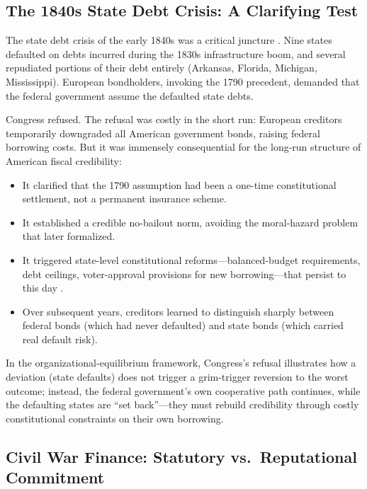 \documentclass[12pt]{article}
\begin{document}
\subsection{The 1840s State Debt Crisis: A Clarifying Test}

The state debt crisis of the early 1840s was a critical juncture
\citep{Ratchford1941, McGrane1935}.  Nine states defaulted on debts
incurred during the 1830s infrastructure boom, and several repudiated
portions of their debt entirely (Arkansas, Florida, Michigan,
Mississippi).  European bondholders, invoking the 1790 precedent,
demanded that the federal government assume the defaulted state debts.

Congress refused.  The refusal was costly in the short run: European
creditors temporarily downgraded all American government bonds, raising
federal borrowing costs.  But it was immensely consequential for the
long-run structure of American fiscal credibility:

\begin{itemize}
  \item It clarified that the 1790 assumption had been a one-time
    constitutional settlement, not a permanent insurance scheme.
  \item It  established a credible no-bailout norm, avoiding the
    moral-hazard problem that \citet{KarekenWallace1978} later
    formalized.
  \item It triggered state-level constitutional reforms---balanced-budget
    requirements, debt ceilings, voter-approval provisions for new
    borrowing---that persist to this day \citep{Wallis2005}.
  \item Over subsequent years, creditors learned to distinguish
    sharply between federal bonds (which had never defaulted) and state
    bonds (which carried real default risk).
\end{itemize}

In the organizational-equilibrium framework, Congress's refusal
illustrates how a deviation (state defaults) does not trigger a
grim-trigger reversion to the worst outcome; instead, the federal
government's own cooperative path continues, while the defaulting states
are ``set back''---they must rebuild credibility through costly
constitutional constraints on their own borrowing.

\subsection{Civil War Finance: Statutory vs.\ Reputational Commitment}
\end{document}
